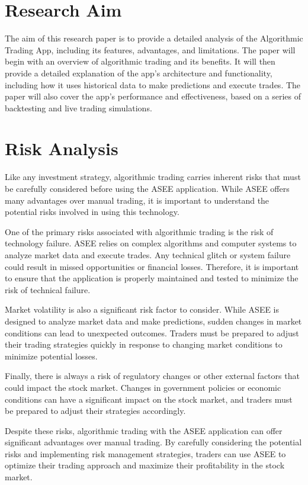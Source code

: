 \section{Research Aim}
The aim of this research paper is to provide a detailed analysis of the Algorithmic Trading App, including its features, advantages, and limitations. The paper will begin with an overview of algorithmic trading and its benefits. It will then provide a detailed explanation of the app's architecture and functionality, including how it uses historical data to make predictions and execute trades. The paper will also cover the app's performance and effectiveness, based on a series of backtesting and live trading simulations.

\section{Risk Analysis}
Like any investment strategy, algorithmic trading carries inherent risks that must be carefully considered before using the ASEE application. While ASEE offers many advantages over manual trading, it is important to understand the potential risks involved in using this technology.

One of the primary risks associated with algorithmic trading is the risk of technology failure. ASEE relies on complex algorithms and computer systems to analyze market data and execute trades. Any technical glitch or system failure could result in missed opportunities or financial losses. Therefore, it is important to ensure that the application is properly maintained and tested to minimize the risk of technical failure.

Market volatility is also a significant risk factor to consider. While ASEE is designed to analyze market data and make predictions, sudden changes in market conditions can lead to unexpected outcomes. Traders must be prepared to adjust their trading strategies quickly in response to changing market conditions to minimize potential losses.

Finally, there is always a risk of regulatory changes or other external factors that could impact the stock market. Changes in government policies or economic conditions can have a significant impact on the stock market, and traders must be prepared to adjust their strategies accordingly.

Despite these risks, algorithmic trading with the ASEE application can offer significant advantages over manual trading. By carefully considering the potential risks and implementing risk management strategies, traders can use ASEE to optimize their trading approach and maximize their profitability in the stock market.

